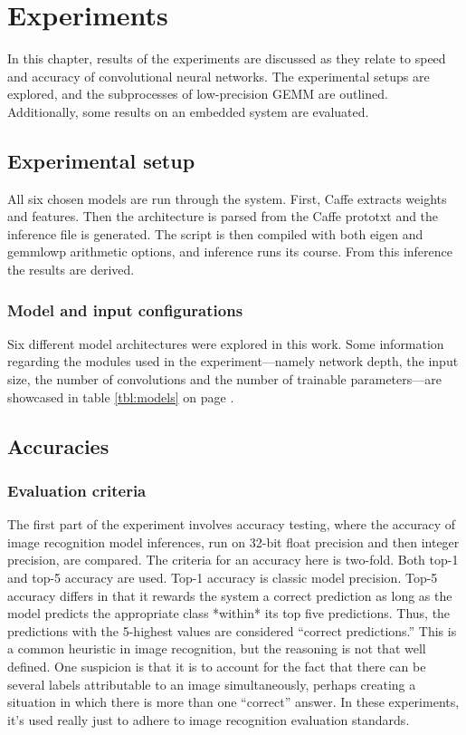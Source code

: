 \chapter{Experiments}
In this chapter, results of the experiments are discussed as they relate to speed and accuracy of convolutional neural networks. The experimental setups are explored, and the subprocesses of low-precision GEMM are outlined. Additionally, some results on an embedded system are evaluated.

\section{Experimental setup}
All six chosen models are run through the system. First, Caffe extracts weights and features. Then the architecture is parsed from the Caffe prototxt and the inference file is generated. The script is then compiled with both eigen and gemmlowp arithmetic options, and inference runs its course. From this inference the results are derived.

\subsection{Model and input configurations}
Six different model architectures were explored in this work. Some information regarding the modules used in the experiment---namely network depth, the input size, the number of convolutions and the number of trainable parameters---are showcased in table \ref{tbl:models} on page \pageref{tbl:models}.

\section{Accuracies}
\subsection{Evaluation criteria}
The first part of the experiment involves accuracy testing, where the accuracy of image recognition model inferences, run on 32-bit float precision and then integer precision, are compared. The criteria for an accuracy here is two-fold. Both top-1 and top-5 accuracy are used. Top-1 accuracy is classic model precision. Top-5 accuracy differs in that it rewards the system a correct prediction as long as the model predicts the appropriate class *within* its top five predictions. Thus, the predictions with the 5-highest values are considered ``correct predictions.'' This is a common heuristic in image recognition, but the reasoning is not that well defined. One suspicion is that it is to account for the fact that there can be several labels attributable to an image simultaneously, perhaps creating a situation in which there is more than one ``correct'' answer. In these experiments, it's used really just to adhere to image recognition evaluation standards.

